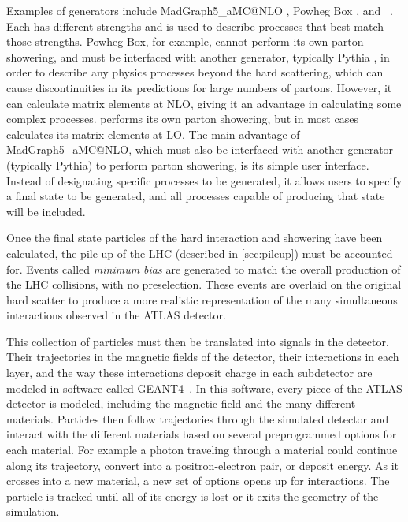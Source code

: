 Examples of generators include {\sc MadGraph5\_aMC@NLO} \cite{Alwall:2014hca}, {\sc Powheg Box} \cite{PowhegBOX1,PowhegBOX2,PowhegBOX3}, and \sherpa~\cite{sherpa}. Each has different strengths and is used to describe processes that best match those strengths. {\sc Powheg Box}, for example, cannot perform its own parton showering, and must be interfaced with another generator, typically {\sc Pythia} \cite{Sjostrand:2006za}, in order to describe any physics processes beyond the hard scattering, which can cause discontinuities in its predictions for large numbers of partons. However, it can calculate matrix elements at \ac{NLO}, giving it an advantage in calculating some complex processes. \sherpa performs its own parton showering, but in most cases calculates its matrix elements at \ac{LO}. The main advantage of {\sc MadGraph5\_aMC@NLO}, which must also be interfaced with another generator (typically {\sc Pythia}) to perform parton showering, is its simple user interface. Instead of designating specific processes to be generated, it allows users to specify a final state to be generated, and all processes capable of producing that state will be included.

Once the final state particles of the hard interaction and showering have been calculated, the pile-up of the \ac{LHC} (described in \autoref{sec:pileup}) must be accounted for. Events called \textit{minimum bias} are generated to match the overall production of the \ac{LHC} collisions, with no preselection. These events are overlaid on the original hard scatter to produce a more realistic representation of the many simultaneous interactions observed in the \ac{ATLAS} detector.

This collection of particles must then be translated into signals in the detector. Their trajectories in the magnetic fields of the detector, their interactions in each layer, and the way these interactions deposit charge in each subdetector are modeled in software called {\sc GEANT4}~\cite{Agostinelli:2002hh}. In this software, every piece of the \ac{ATLAS} detector is modeled, including the magnetic field and the many different materials. Particles then follow trajectories through the simulated detector and interact with the different materials based on several preprogrammed options for each material. For example a photon traveling through a material could continue along its trajectory, convert into a positron-electron pair, or deposit energy. As it crosses into a new material, a new set of options opens up for interactions. The particle is tracked until all of its energy is lost or it exits the geometry of the simulation.

